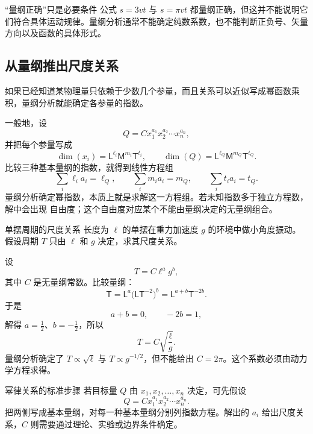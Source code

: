 \documentclass[UTF8,zihao=-4,oneside,openany]{ctexbook}
\numberwithin{equation}{section}
\newcommand{\dimens}[1]{\operatorname{dim}\!\left(#1\right)}
\begin{document}
\begin{warningbox}{“量纲正确”只是必要条件}
公式 $s=3vt$ 与 $s=\pi vt$ 都量纲正确，但这并不能说明它们符合具体运动规律。量纲分析通常不能确定纯数系数，也不能判断正负号、矢量方向以及函数的具体形式。
\end{warningbox}

\subsection{从量纲推出尺度关系}

如果已经知道某物理量只依赖于少数几个参量，而且关系可以近似写成幂函数乘积，量纲分析就能确定各参量的指数。

一般地，设
\[
  Q=Cx_1^{a_1}x_2^{a_2}\cdots x_n^{a_n},
\]
并把每个参量写成
\[
  \dimens{x_i}=\mathsf{L}^{\ell_i}\mathsf{M}^{m_i}\mathsf{T}^{t_i},
  \qquad
  \dimens{Q}=\mathsf{L}^{\ell_Q}\mathsf{M}^{m_Q}\mathsf{T}^{t_Q}.
\]
比较三种基本量纲的指数，就得到线性方程组
\begin{equation}
  \sum_i \ell_i a_i=\ell_Q,
  \qquad
  \sum_i m_i a_i=m_Q,
  \qquad
  \sum_i t_i a_i=t_Q.
  \label{eq:dimension-linear-system}
\end{equation}
量纲分析确定幂指数，本质上就是求解这一方程组。若未知指数多于独立方程数，解中会出现
自由度；这个自由度对应某个不能由量纲决定的无量纲组合。

\begin{examplebox}{单摆周期的尺度关系}
长度为 $\ell$ 的单摆在重力加速度 $g$ 的环境中做小角度振动。假设周期 $T$ 只由 $\ell$ 和 $g$ 决定，求其尺度关系。

\tcblower
设
\[
  T=C\ell^a g^b,
\]
其中 $C$ 是无量纲常数。比较量纲：
\[
  \mathsf{T}
  =\mathsf{L}^{a}\bigl(\mathsf{LT}^{-2}\bigr)^b
  =\mathsf{L}^{a+b}\mathsf{T}^{-2b}.
\]
于是
\[
  a+b=0,\qquad -2b=1,
\]
解得 $a=\frac12$、$b=-\frac12$，所以
\begin{equation}
  T=C\sqrt{\frac{\ell}{g}}.
  \label{eq:pendulum-scaling}
\end{equation}
量纲分析确定了 $T\propto \sqrt{\ell}$ 与 $T\propto g^{-1/2}$，但不能给出 $C=2\pi$。这个系数必须由动力学方程求得。
\end{examplebox}

\begin{methodbox}{幂律关系的标准步骤}
若目标量 $Q$ 由 $x_1,x_2,\ldots,x_n$ 决定，可先假设
\[
  Q=Cx_1^{a_1}x_2^{a_2}\cdots x_n^{a_n}.
\]
把两侧写成基本量纲，对每一种基本量纲分别列指数方程。解出的 $a_i$ 给出尺度关系，$C$ 则需要通过理论、实验或边界条件确定。
\end{methodbox}
\end{document}
